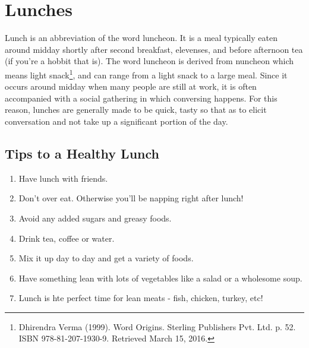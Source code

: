 \AddToShipoutPicture*{\SalmonVegetableRice}
\chapter{Lunches}

Lunch is an abbreviation of the word luncheon. It is a meal typically eaten around midday shortly after second breakfast, elevenses, and before afternoon tea (if you're a hobbit that is). The word luncheon is derived from nuncheon which means light snack\footnote{Dhirendra Verma (1999). Word Origins. Sterling Publishers Pvt. Ltd. p. 52. ISBN 978-81-207-1930-9. Retrieved March 15, 2016.}, and can range from a light snack to a large meal. Since it occurs around midday when many people are still at work, it is often accompanied with a social gathering in which conversing happens. For this reason, lunches are generally made to be quick, tasty so that as to elicit conversation and not take up a significant portion of the day.

\section*{Tips to a Healthy Lunch}
\begin{enumerate}
	\item Have lunch with friends.
	\item Don't over eat. Otherwise you'll be napping right after lunch!
	\item Avoid any added sugars and greasy foods.
	\item Drink tea, coffee or water.
	\item Mix it up day to day and get a variety of foods.
	\item Have something lean with lots of vegetables like a salad or a wholesome soup.
	\item Lunch is hte perfect time for lean meats - fish, chicken, turkey, etc!
\end{enumerate}